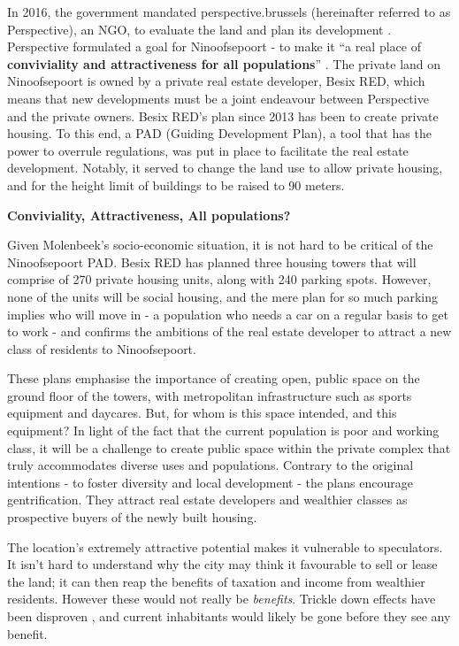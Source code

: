 \documentclass{article}[11pt]
\begin{document}
In 2016, the government mandated perspective.brussels (hereinafter referred to as Perspective), an NGO, to evaluate the land and plan its development \parencite{diagnosticNinove}. Perspective formulated a goal for Ninoofsepoort - to make it ``a real place of \textbf{conviviality and attractiveness for all populations}'' \parencite{perspectiveNinove}. 
The private land on Ninoofsepoort is owned by a private real estate developer, Besix RED, which means that new developments must be a joint endeavour between Perspective and the private owners. Besix RED's plan since 2013 has been to create private housing. 
To this end, a PAD (Guiding Development Plan), a tool that has the power to overrule regulations, was put in place to facilitate the real estate development. Notably, it served to change the land use to allow private housing, and for the height limit of buildings to be raised to 90 meters. 

\textbf{Conviviality, Attractiveness, All populations?}

Given Molenbeek's socio-economic situation, it is not hard to be critical of the Ninoofsepoort PAD. Besix RED has planned three housing towers that will comprise of 270 private housing units, along with 240 parking spots. However, none of the units will be social housing, and the mere plan for so much parking implies who will move in - a population who needs a car on a regular basis to get to work - and confirms the ambitions of the real estate developer to attract a new class of residents to Ninoofsepoort.

These plans emphasise the importance of creating open, public space on the ground floor of the towers, with metropolitan infrastructure such as sports equipment and daycares. But, for whom is this space intended, and this equipment? In light of the fact that the current population is poor and working class, it will be a challenge to create public space within the private complex that truly accommodates diverse uses and populations. 
Contrary to the original intentions - to foster diversity and local development - the plans encourage gentrification. They attract real estate developers and wealthier classes as prospective buyers of the newly built housing.

The location's extremely attractive potential makes it vulnerable to speculators. It isn't hard to understand why the city may think it favourable to sell or lease the land; it can then reap the benefits of taxation and income from wealthier residents. 
However these would not really be \textit{benefits}. Trickle down effects have been disproven \parencite{stiglitz2016inequality}, and current inhabitants would likely be gone before they see any benefit.
\end{document}
